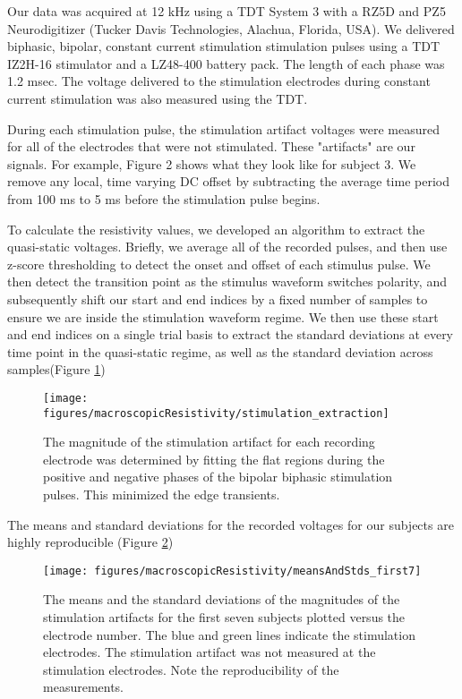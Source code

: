 Our data was acquired at 12 kHz using a TDT System 3 with a RZ5D and PZ5 Neurodigitizer (Tucker Davis Technologies, Alachua, Florida, USA). We delivered biphasic, bipolar, constant current stimulation stimulation pulses using a TDT IZ2H-16 stimulator and a LZ48-400 battery pack. The length of each phase was 1.2 msec. The voltage delivered to the stimulation electrodes during constant current stimulation was also measured using the TDT. 

During each stimulation pulse, the stimulation artifact voltages were measured for all of the electrodes that were not stimulated. These "artifacts" are our signals. For example, Figure 2 shows what they look like for subject 3. We remove any local, time varying DC offset by subtracting the average time period from 100 ms to 5 ms before the stimulation pulse begins. 

To calculate the resistivity values, we developed an algorithm to extract the quasi-static voltages. Briefly, we average all of the recorded pulses, and then use z-score thresholding to detect the onset and offset of each stimulus pulse. We then detect the transition point as the stimulus waveform switches polarity, and subsequently shift our start and end indices by a fixed number of samples to ensure we are inside the stimulation waveform regime. We then use these start and end indices on a single trial basis to extract the standard deviations at every time point in the quasi-static regime, as well as the standard deviation across samples(Figure \ref{fig:mrStimExtraction})

\begin{figure}[ht]
	\centering
	\texttt{[image: figures/macroscopicResistivity/stimulation\_extraction]}
	\caption[Data extraction]{The magnitude of the stimulation artifact for each recording electrode was determined by fitting the flat regions during the positive and negative phases of the bipolar biphasic stimulation pulses. This minimized the edge transients.}
	\label{fig:mrStimExtraction}
\end{figure}

The means and standard deviations for the recorded voltages for our subjects are highly reproducible (Figure \ref{fig:mrMeansStandards})

\begin{figure}[ht]
	\centering
	\texttt{[image: figures/macroscopicResistivity/meansAndStds\_first7]}
	\caption[Data quality]{The means and the standard deviations of the magnitudes of the stimulation artifacts for the first seven subjects plotted versus the electrode number. The blue and green lines indicate the stimulation electrodes. The stimulation artifact was not measured at the stimulation electrodes. Note the reproducibility of the measurements.}
	\label{fig:mrMeansStandards}
\end{figure}


